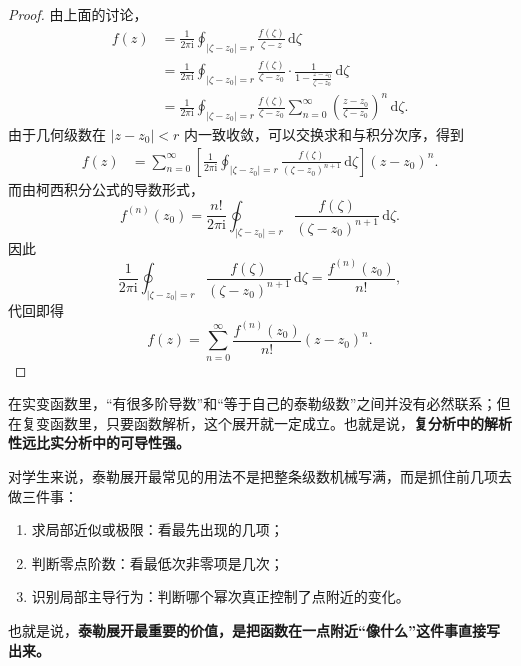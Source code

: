 \begin{proof}
由上面的讨论，
\begin{align*}
    f(z)
    &= \frac{1}{2\pi \mathrm{i}}\oint_{|\zeta-z_0|=r}
    \frac{f(\zeta)}{\zeta-z}\,\mathrm{d}\zeta \\
    &= \frac{1}{2\pi \mathrm{i}}\oint_{|\zeta-z_0|=r}
    \frac{f(\zeta)}{\zeta-z_0}
    \cdot
    \frac{1}{1-\frac{z-z_0}{\zeta-z_0}}
    \,\mathrm{d}\zeta \\
    &= \frac{1}{2\pi \mathrm{i}}\oint_{|\zeta-z_0|=r}
    \frac{f(\zeta)}{\zeta-z_0}
    \sum_{n=0}^{\infty}
    \left(\frac{z-z_0}{\zeta-z_0}\right)^n
    \,\mathrm{d}\zeta.
\end{align*}
由于几何级数在 $|z-z_0|<r$ 内一致收敛，可以交换求和与积分次序，得到
\begin{align*}
    f(z)
    &= \sum_{n=0}^{\infty}
    \left[
        \frac{1}{2\pi \mathrm{i}}
        \oint_{|\zeta-z_0|=r}
        \frac{f(\zeta)}{(\zeta-z_0)^{n+1}}
        \,\mathrm{d}\zeta
    \right]
    (z-z_0)^n.
\end{align*}
而由柯西积分公式的导数形式，
\[
    f^{(n)}(z_0)
    = \frac{n!}{2\pi \mathrm{i}}
    \oint_{|\zeta-z_0|=r}
    \frac{f(\zeta)}{(\zeta-z_0)^{n+1}}
    \,\mathrm{d}\zeta.
\]
因此
\[
    \frac{1}{2\pi \mathrm{i}}
    \oint_{|\zeta-z_0|=r}
    \frac{f(\zeta)}{(\zeta-z_0)^{n+1}}
    \,\mathrm{d}\zeta
    = \frac{f^{(n)}(z_0)}{n!},
\]
代回即得
\[
    f(z)=\sum_{n=0}^{\infty}\frac{f^{(n)}(z_0)}{n!}(z-z_0)^n.
\]
\end{proof}

\begin{tishi}[这一结论为什么惊人]
在实变函数里，``有很多阶导数''和``等于自己的泰勒级数''之间并没有必然联系；但在复变函数里，只要函数解析，这个展开就一定成立。也就是说，\textbf{复分析中的解析性远比实分析中的可导性强。}
\end{tishi}

\begin{tishi}[拿到泰勒展开以后怎么用]
对学生来说，泰勒展开最常见的用法不是把整条级数机械写满，而是抓住前几项去做三件事：
\begin{enumerate}
    \item 求局部近似或极限：看最先出现的几项；
    \item 判断零点阶数：看最低次非零项是几次；
    \item 识别局部主导行为：判断哪个幂次真正控制了点附近的变化。
\end{enumerate}
也就是说，\textbf{泰勒展开最重要的价值，是把函数在一点附近``像什么''这件事直接写出来。}
\end{tishi}

